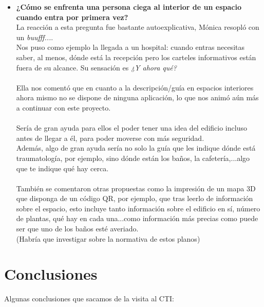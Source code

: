 \documentclass{article}
\begin{document}
\begin{itemize}
		\item \textbf{¿Cómo se enfrenta una persona ciega al interior de un espacio cuando entra por primera vez?}
		\\
		La reacción a esta pregunta fue bastante autoexplicativa, Mónica resopló con un \textit{buufff...}. 
		\\
		Nos puso como ejemplo la llegada a un hospital: cuando entras necesitas saber, al menos, dónde está la recepción pero los carteles informativos están fuera de su alcance. Su sensación es \textit{¿Y ahora qué?}
		\\
		\\
		Ella nos comentó que en cuanto a la descripción/guía en espacios interiores ahora mismo no se dispone de ninguna aplicación, lo que nos animó aún más a continuar con este proyecto.
		\\
		\\
		Sería de gran ayuda para ellos el poder tener una idea del edificio incluso antes de llegar a él, para poder moverse con más seguridad. 
		\\
		Además, algo de gran ayuda sería no solo la guía que les indique dónde está traumatología, por ejemplo, sino dónde están los baños, la cafetería,...algo que te indique qué hay cerca.
		\\
		\\
		También se comentaron otras propuestas como la impresión de un mapa 3D que disponga de un código QR, por ejemplo, que tras leerlo de información sobre el espacio, esto incluye tanto información sobre el edificio en sí, número de plantas, qué hay en cada una...como información más precias como puede ser que uno de los baños esté averiado.
		\\ (Habría que investigar sobre la normativa de estos planos)
		 
	
	\end{itemize}


	\section{Conclusiones}
	Algunas conclusiones que sacamos de la visita al CTI:
	
\end{document}
